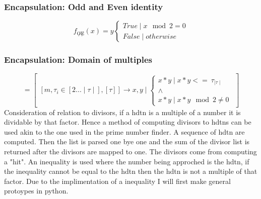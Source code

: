 \documentclass{article}
\begin{document}
\subsubsection{Encapsulation: Odd and Even identity}
\begin{equation}
	f_{\not O\not E}(x) = y
	\begin{cases} True  \mid x \mod 2 = 0\\
	False \mid otherwise\end{cases}
\end{equation}
\subsubsection{Encapsulation: Domain of multiples}
\begin{equation}[\sigma]=\begin{bmatrix} [m,\tau_i \in [2...\mid\tau\mid],[\tau]]\rightarrow x,y \mid
	\begin{cases}
		x*y\mid x*y <= \ \tau_{\mid\tau\mid}\\ 
		\land\\x*y\mid x*y \mod 2 \not = 0
	\end{cases}\end{bmatrix}
\end{equation}
Consideration of relation to divisors, if a hdtn is a multiple of a number it is dividable by that factor.
Hence a method of computing divisors to hdtns can be used akin to the one used in the prime number finder.
A sequence of hdtn are computed. Then the list is parsed one bye one and the sum of the divisor list is
returned after the divisors are mapped to one. The divisors come from computing a "hit". An inequality is
used where the number being approched is the hdtn, if the inequality cannot be equal to the hdtn then the
hdtn is not a multiple of that factor. Due to the implimentation of a inequality I will first make general
protoypes in python.
\end{document}
